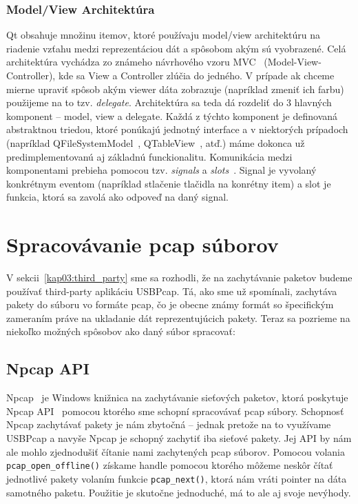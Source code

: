 \subsubsection*{Model/View Architektúra}
\label{kap3:sec:model_view}
Qt obsahuje množinu itemov, ktoré používaju model/view architektúru na riadenie vzťahu medzi reprezentáciou dát a spôsobom akým sú vyobrazené. Celá architektúra vychádza zo známeho návrhového vzoru MVC~\cite{mvc} (Model-View-Controller), kde sa View a Controller zlúčia do jedného. V prípade ak chceme mierne upraviť spôsob akým viewer dáta zobrazuje (napríklad zmeniť ich farbu) použijeme na to tzv. \textit{delegate}. Architektúra sa teda dá rozdeliť do 3 hlavných komponent -- model, view a delegate. Každá z týchto komponent je definovaná abstraktnou triedou, ktoré ponúkajú jednotný interface a v niektorých prípadoch (napríklad QFileSystemModel~\cite{qfilesystemmodel}, QTableView~\cite{qtableview}, atď.) máme dokonca už predimplementovanú aj základnú funckionalitu. Komunikácia medzi komponentami prebieha pomocou tzv. \textit{signals} a \textit{slots}~\cite{signal_slot}. Signal je vyvolaný konkrétnym eventom (napríklad stlačenie tlačidla na konrétny item) a slot je funkcia, ktorá sa zavolá ako odpoveď na daný signal.


\section{Spracovávanie pcap súborov}
\label{kap03:sec:sprac_sub}
V sekcii~\ref{kap03:third_party} sme sa rozhodli, že na zachytávanie paketov budeme používať third-party aplikáciu USBPcap. Tá, ako sme už spomínali, zachytáva pakety do súboru vo formáte pcap, čo je obecne známy formát so špecifickým zameraním práve na ukladanie dát reprezentujúcich pakety. Teraz sa pozrieme na niekoľko možných spôsobov ako daný súbor spracovať:

\subsection*{Npcap API}
Npcap~\cite{npcap} je Windows knižnica na zachytávanie sieťových paketov, ktorá poskytuje Npcap API~\cite{npcap_api} pomocou ktorého sme schopní spracovávať pcap súbory. Schopnosť Npcap zachytávať pakety je nám zbytočná -- jednak pretože na to využívame USBPcap a navyše Npcap je schopný zachytiť iba sieťové pakety. Jej API by nám ale mohlo zjednodušiť čítanie nami zachytených pcap súborov. Pomocou volania \texttt{pcap\_open\_offline()} získame handle pomocou ktorého môžeme neskôr čítať jednotlivé pakety volaním funkcie \texttt{pcap\_next()}, ktorá nám vráti pointer na dáta samotného paketu. Použitie je skutočne jednoduché, má to ale aj svoje nevýhody.

